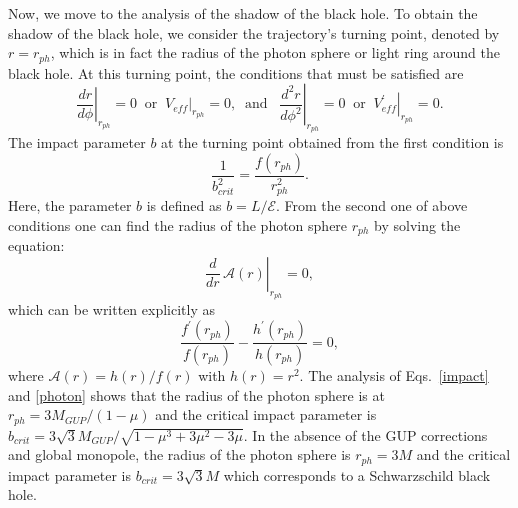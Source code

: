 \documentclass[aps,amsmath,amssymb,showpacs,showkeys]{revtex4}
\begin{document}
Now, we move to the analysis of the shadow of the black hole. To obtain the
shadow of the black hole, we consider the trajectory's turning point, denoted 
by $r=r_{ph}$, which is in fact the radius of the photon sphere or light ring
around the black hole. 
At this turning point, the conditions that must be satisfied are 
\cite{18, synge, Luminet:1979nyg}
\begin{equation} 
\left.\frac{dr}{d\phi}\right|_{r_{ph}}\!\!\!\!\!\!\!=0\;\; \text{or}\;\; \left.V_{eff}\right|_{r_{ph}}\!\!\!\!=0,\;\; \text{and}\;\;\; \left.\frac{d^2r}{d\phi^2}\right|_{r_{ph}}\!\!\!\!\!\!\!=0
\;\; \text{or}\;\; \left.V_{eff}^{\prime}\right|_{r_{ph}}\!\!\!\!=0.
\end{equation} 
The impact parameter $b$ at the turning point obtained from the first 
condition is
\begin{equation}
\frac{1}{b_{crit}^{2}}=\frac{f(r_{ph})}{r_{ph}^{2}}.
\label{impact}
\end{equation}
Here, the parameter $b$ is defined as $b=L/\mathcal{E}$. From the second one of 
above conditions one can find the radius of the photon sphere $r_{ph}$ by 
solving the equation: 
\begin{equation}
\left.\frac{d}{dr}\,\mathcal{A}(r)\right|_{r_{ph}}\!\!\!\!\!\!\! = 0,
\end{equation}
which can be written explicitly as
\begin{equation}
\frac{f^{\prime}(r_{ph})}{f(r_{ph})}-\frac{h^{\prime}(r_{ph})}{h(r_{ph})}=0,
\label{photon}
\end{equation}
where $\mathcal{A}(r)=h(r)/f(r)$ with $h(r)=r^{2}$. The analysis of 
Eqs.\ \eqref{impact} and \eqref{photon} shows that the radius of the photon 
sphere is at $r_{ph}=3M_{GUP}/(1-\mu)$ and the critical impact parameter is 
$b_{crit}=3\sqrt{3}M_{GUP}/\sqrt{1-\mu^3+3\mu^2-3\mu}$. In the absence of the 
GUP corrections and global monopole, the radius of the photon sphere is 
$r_{ph}=3M$ and the critical impact parameter is $b_{crit}=3\sqrt{3}M$ which 
corresponds to a Schwarzschild black hole.
 
\end{document}
